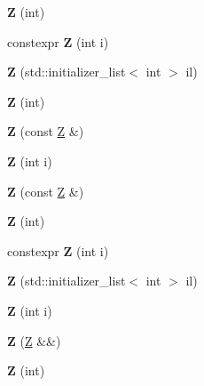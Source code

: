 \begin{DoxyCompactItemize}
\item 
\mbox{\label{struct_z_a023e202cb9477d4eba41e74dcdc17e9d}} 
{\bfseries Z} (int)
\item 
\mbox{\label{struct_z_a2cd3af8ae0badd574734f80e9ceb3eaf}} 
constexpr {\bfseries Z} (int i)
\item 
\mbox{\label{struct_z_ae8e32461ae3a4118f0cc413a91899e34}} 
{\bfseries Z} (std\+::initializer\+\_\+list$<$ int $>$ il)
\item 
\mbox{\label{struct_z_a023e202cb9477d4eba41e74dcdc17e9d}} 
{\bfseries Z} (int)
\item 
\mbox{\label{struct_z_a799fe256bfadbe26d4603b42f7bed9a2}} 
{\bfseries Z} (const \mbox{\hyperlink{struct_z}{Z}} \&)
\item 
\mbox{\label{struct_z_a9adee188d04926f42b2d04dbc9ee561a}} 
{\bfseries Z} (int i)
\item 
\mbox{\label{struct_z_a799fe256bfadbe26d4603b42f7bed9a2}} 
{\bfseries Z} (const \mbox{\hyperlink{struct_z}{Z}} \&)
\item 
\mbox{\label{struct_z_a023e202cb9477d4eba41e74dcdc17e9d}} 
{\bfseries Z} (int)
\item 
\mbox{\label{struct_z_a2cd3af8ae0badd574734f80e9ceb3eaf}} 
constexpr {\bfseries Z} (int i)
\item 
\mbox{\label{struct_z_ae8e32461ae3a4118f0cc413a91899e34}} 
{\bfseries Z} (std\+::initializer\+\_\+list$<$ int $>$ il)
\item 
\mbox{\label{struct_z_a9adee188d04926f42b2d04dbc9ee561a}} 
{\bfseries Z} (int i)
\item 
\mbox{\label{struct_z_ac53eb4bfb68c3fd654047e8aeb253d82}} 
{\bfseries Z} (\mbox{\hyperlink{struct_z}{Z}} \&\&)
\item 
\mbox{\label{struct_z_a023e202cb9477d4eba41e74dcdc17e9d}} 
{\bfseries Z} (int)
\item 

\end{DoxyCompactItemize}
